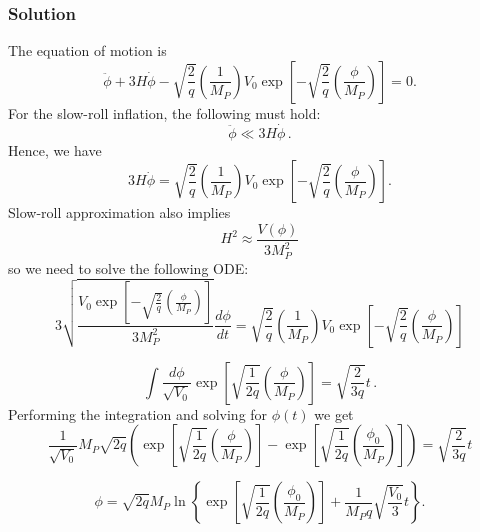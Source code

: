 \subsubsection*{Solution}
The equation of motion is
\begin{equation}
\ddot{\phi} + 3 H \dot{\phi} - \sqrt{\frac{2}{q}} \left( \frac{1}{M_P} \right) V_0 \exp \left[ - \sqrt{\frac{2}{q}} \left( \frac{\phi}{M_P} \right) \right] = 0.
\end{equation}
For the slow-roll inflation, the following must hold: 
\begin{equation}
    \ddot{\phi}\ll 3H\dot{\phi} \,.
\end{equation}
Hence, we have
\begin{equation}
3 H \dot{\phi} = \sqrt{\frac{2}{q}} \left( \frac{1}{M_P} \right) V_0 \exp \left[ - \sqrt{\frac{2}{q}} \left( \frac{\phi}{M_P} \right) \right].
\end{equation}
Slow-roll approximation also implies 
\begin{equation}
H^2\approx\frac{V(\phi)}{3M^2_P}
\end{equation}
so we need to solve the following ODE:
\begin{equation}
3 \sqrt{\frac{V_0 \exp \left[ - \sqrt{\frac{2}{q}} \left( \frac{\phi}{M_P} \right) \right]}{3 M_P^2}} \frac{d\phi}{dt} = \sqrt{\frac{2}{q}} \left( \frac{1}{M_P} \right) V_0 \exp \left[ - \sqrt{\frac{2}{q}} \left( \frac{\phi}{M_P} \right) \right]
\end{equation}

\begin{equation}
\int \frac{d\phi}{\sqrt{V_0}} \exp \left[ \sqrt{\frac{1}{2q}} \left( \frac{\phi}{M_P} \right) \right] = \sqrt{\frac{2}{3q}} t \,.
\end{equation}
Performing the integration and solving for $\phi(t)$ we get
\begin{equation}
\frac{1}{\sqrt{V_0}} M_P \sqrt{2q} \left( \exp \left[ \sqrt{\frac{1}{2q}} \left( \frac{\phi}{M_P} \right) \right] - \exp \left[ \sqrt{\frac{1}{2q}} \left( \frac{\phi_0}{M_P} \right) \right] \right) = \sqrt{\frac{2}{3q}} t
\end{equation}

\begin{equation}
\boxed{
\phi = \sqrt{2q} M_P \ln \left\{ \exp \left[ \sqrt{\frac{1}{2q}} \left( \frac{\phi_0}{M_P} \right) \right] + \frac{1}{M_P q} \sqrt{\frac{V_0}{3}} t \right\}}.
\end{equation}



